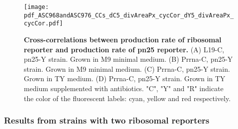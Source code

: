 \begin{figure}
    \centering
    \texttt{[image: pdf\_ASC968andASC976\_CCs\_dC5\_divAreaPx\_cycCor\_dY5\_divAreaPx\_cycCor.pdf]}
    \caption{ 
        \textbf{Cross-correlations between production rate of ribosomal reporter and production rate of pn25 reporter.}
        (A) L19-C, pn25-Y strain. Grown in M9 minimal medium.
        (B) Prrna-C, pn25-Y strain. Grown in M9 minimal medium.
        (C) Prrna-C, pn25-Y strain. Grown in TY medium.
        (D) Prrna-C, pn25-Y strain. Grown in TY medium supplemented with antibiotics.
        "C", "Y" and "R" indicate the color of the fluorescent labels: cyan, yellow and red respectively.
    }
    \label{fig:ribo:CCsPPRiboPn25}
\end{figure}




\subsubsection{Results from strains with two ribosomal reporters}

